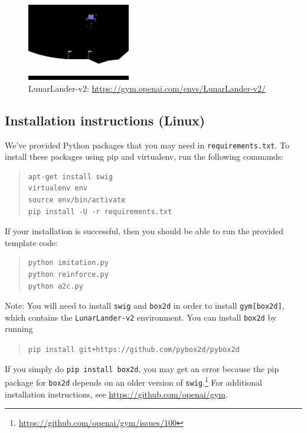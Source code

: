 \documentclass[12pt]{article}
\begin{document}
\begin{center}
\begin{figure}[h]\centering
\includegraphics[width=0.4\textwidth]{lunarlander.jpg}
\caption{LunarLander-v2: \url{https://gym.openai.com/envs/LunarLander-v2/} \label{fig:lunarlander-v2}}
\end{figure}
\end{center}

\subsection*{Installation instructions (Linux)}

We've provided Python packages that you may need in \texttt{requirements.txt}. To install these packages using pip and virtualenv, run the following commands:
\begin{quote}
\begin{verbatim}
apt-get install swig
virtualenv env
source env/bin/activate
pip install -U -r requirements.txt
\end{verbatim}
\end{quote}
If your installation is successful, then you should be able to run the provided template code:
\begin{quote}
\begin{verbatim}
python imitation.py
python reinforce.py
python a2c.py
\end{verbatim}
\end{quote}

Note: You will need to install \texttt{swig} and \texttt{box2d} in order to install \texttt{gym[box2d]}, which contains the \texttt{LunarLander-v2} environment. You can install \texttt{box2d} by running
\begin{quote}
\texttt{pip install git+https://github.com/pybox2d/pybox2d}
\end{quote}
If you simply do \texttt{pip install box2d}, you may get an error because the pip package for \texttt{box2d} depends on an older version of \texttt{swig}.\footnote{\url{https://github.com/openai/gym/issues/100}} For additional installation instructions, see \url{https://github.com/openai/gym}.
\end{document}
